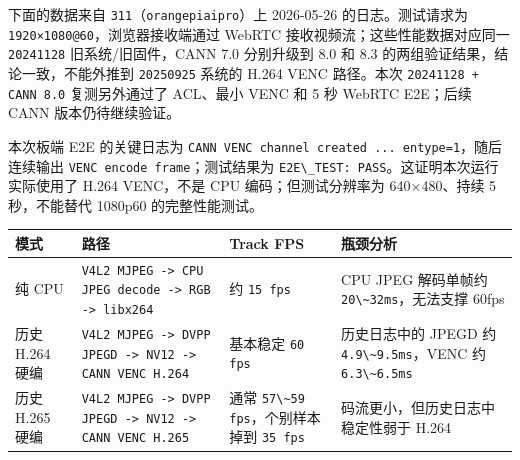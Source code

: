 下面的数据来自
\passthrough{\lstinline!311!}（\passthrough{\lstinline!orangepiaipro!}）上
2026-05-26 的日志。测试请求为
\passthrough{\lstinline!1920×1080@60!}，浏览器接收端通过 WebRTC
接收视频流；这些性能数据对应同一 \passthrough{\lstinline!20241128!}
旧系统/旧固件，CANN 7.0 分别升级到 8.0 和 8.3
的两组验证结果，结论一致，不能外推到 \passthrough{\lstinline!20250925!}
系统的 H.264 VENC 路径。本次
\passthrough{\lstinline!20241128 + CANN 8.0!} 复测另外通过了 ACL、最小
VENC 和 5 秒 WebRTC E2E；后续 CANN 版本仍待继续验证。

本次板端 E2E 的关键日志为
\passthrough{\lstinline!CANN VENC channel created ... entype=1!}，随后连续输出
\passthrough{\lstinline!VENC encode frame!}；测试结果为
\passthrough{\lstinline!E2E\_TEST: PASS!}。这证明本次运行实际使用了
H.264 VENC，不是 CPU 编码；但测试分辨率为 640×480、持续 5 秒，不能替代
1080p60 的完整性能测试。

\begin{longtable}[]{@{}
  >{\raggedright\arraybackslash}p{}
  >{\raggedright\arraybackslash}p{}
  >{\raggedright\arraybackslash}p{}
  >{\raggedright\arraybackslash}p{}@{}}
\toprule\noalign{}
\begin{minipage}[b]{\linewidth}\raggedright
模式
\end{minipage} & \begin{minipage}[b]{\linewidth}\raggedright
路径
\end{minipage} & \begin{minipage}[b]{\linewidth}\raggedright
Track FPS
\end{minipage} & \begin{minipage}[b]{\linewidth}\raggedright
瓶颈分析
\end{minipage} \\
\midrule\noalign{}
\endhead
\bottomrule\noalign{}
\endlastfoot
纯 CPU &
\passthrough{\lstinline!V4L2 MJPEG -> CPU JPEG decode -> RGB -> libx264!}
& 约 \passthrough{\lstinline!15 fps!} & CPU JPEG 解码单帧约
\passthrough{\lstinline!20\~32ms!}，无法支撑 60fps \\
历史 H.264 硬编 &
\passthrough{\lstinline!V4L2 MJPEG -> DVPP JPEGD -> NV12 -> CANN VENC H.264!}
& 基本稳定 \passthrough{\lstinline!60 fps!} & 历史日志中的 JPEGD 约
\passthrough{\lstinline!4.9\~9.5ms!}，VENC 约
\passthrough{\lstinline!6.3\~6.5ms!} \\
历史 H.265 硬编 &
\passthrough{\lstinline!V4L2 MJPEG -> DVPP JPEGD -> NV12 -> CANN VENC H.265!}
& 通常 \passthrough{\lstinline!57\~59 fps!}，个别样本掉到
\passthrough{\lstinline!35 fps!} & 码流更小，但历史日志中稳定性弱于
H.264 \\
\end{longtable}

